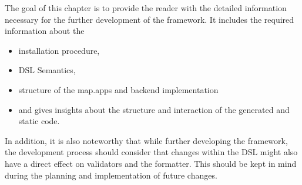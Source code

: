 

The goal of this chapter is to provide the reader with the detailed information necessary for the further development of the \MD framework. It includes the required information about the 

\begin{itemize}
	\item installation procedure,
	\item DSL Semantics,
	\item structure of the map.apps and backend implementation
	\item and  gives insights about the structure and interaction of the generated and static code.
\end{itemize}

In addition, it is also noteworthy that while further developing the framework, the development process should consider that changes within the DSL might also have a direct effect on validators and the formatter. This should be kept in mind during the planning and implementation of future changes.